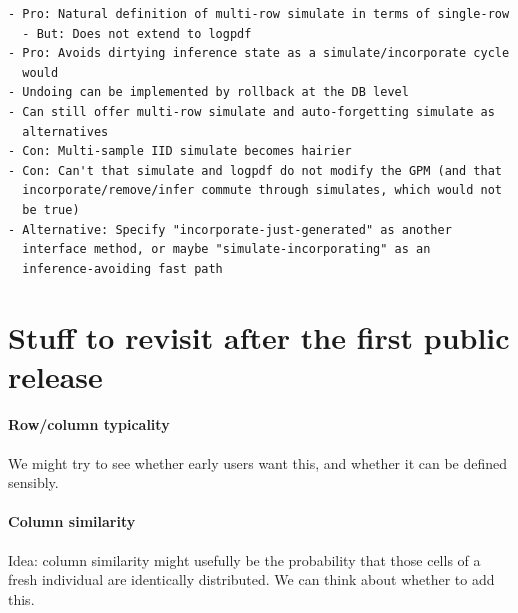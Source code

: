 \documentclass[10pt,letterpaper]{article}
\begin{document}
\begin{verbatim}
- Pro: Natural definition of multi-row simulate in terms of single-row
  - But: Does not extend to logpdf
- Pro: Avoids dirtying inference state as a simulate/incorporate cycle
  would
- Undoing can be implemented by rollback at the DB level
- Can still offer multi-row simulate and auto-forgetting simulate as
  alternatives
- Con: Multi-sample IID simulate becomes hairier
- Con: Can't that simulate and logpdf do not modify the GPM (and that
  incorporate/remove/infer commute through simulates, which would not
  be true)
- Alternative: Specify "incorporate-just-generated" as another
  interface method, or maybe "simulate-incorporating" as an
  inference-avoiding fast path
\end{verbatim}

\appendix
\section{Stuff to revisit after the first public release}

\paragraph{Row/column typicality}
We might try to see whether early users want this, and whether it can
be defined sensibly.

\paragraph{Column similarity}
Idea: column similarity might usefully be the probability that those
cells of a fresh individual are identically distributed.  We can think
about whether to add this.
\end{document}
